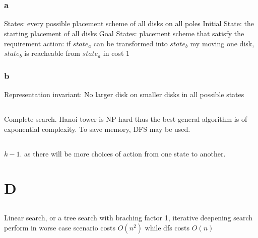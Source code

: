 \documentclass{article}
\begin{document}
\title{}
\author{Wang Xiyu}
\date{}
\maketitle

\section*{}
\subsection{}
\subsubsection*{a}
States: every possible placement scheme of all disks on all poles
Initial State: the starting placement of all disks
Goal States: placement scheme that satisfy the requirement
action: if $state_a$ can be transformed into $state_b$ my moving one disk, $state_b$ is reacheable from $state_a$ in cost 1 
\subsubsection*{b}
Representation invariant: No larger disk on smaller disks in all possible states
\subsection{}
Complete search. Hanoi tower is NP-hard thus the best general algorithm is of exponential complexity. To save memory, DFS may be used.
\subsection{}
$k - 1$. as there will be more choices of action from one state to another.

\section*{}


\section*{}


\section*{D}
\subsection{}
Linear search, or a tree search with braching factor 1, iterative deepening search perform in worse case scenario costs $O(n^2)$
while dfs costs $O(n)$
\subsection{}
\end{document}
